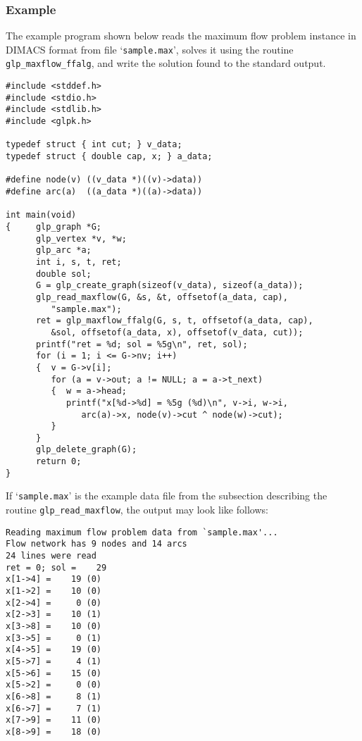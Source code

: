 \documentclass[dvipdfm,11pt]{report}
\begin{document}
\subsubsection*{Example}

The example program shown below reads the maximum flow problem instance
in DIMACS format from file `\verb|sample.max|', solves it using the
routine \verb|glp_maxflow_ffalg|, and write the solution found to the
standard output.

\begin{footnotesize}
\begin{verbatim}
#include <stddef.h>
#include <stdio.h>
#include <stdlib.h>
#include <glpk.h>

typedef struct { int cut; } v_data;
typedef struct { double cap, x; } a_data;

#define node(v) ((v_data *)((v)->data))
#define arc(a)  ((a_data *)((a)->data))

int main(void)
{     glp_graph *G;
      glp_vertex *v, *w;
      glp_arc *a;
      int i, s, t, ret;
      double sol;
      G = glp_create_graph(sizeof(v_data), sizeof(a_data));
      glp_read_maxflow(G, &s, &t, offsetof(a_data, cap),
         "sample.max");
      ret = glp_maxflow_ffalg(G, s, t, offsetof(a_data, cap),
         &sol, offsetof(a_data, x), offsetof(v_data, cut));
      printf("ret = %d; sol = %5g\n", ret, sol);
      for (i = 1; i <= G->nv; i++)
      {  v = G->v[i];
         for (a = v->out; a != NULL; a = a->t_next)
         {  w = a->head;
            printf("x[%d->%d] = %5g (%d)\n", v->i, w->i,
               arc(a)->x, node(v)->cut ^ node(w)->cut);
         }
      }
      glp_delete_graph(G);
      return 0;
}
\end{verbatim}
\end{footnotesize}

If `\verb|sample.max|' is the example data file from the subsection
describing the routine \verb|glp_read_maxflow|, the output may look like
follows:

\begin{footnotesize}
\begin{verbatim}
Reading maximum flow problem data from `sample.max'...
Flow network has 9 nodes and 14 arcs
24 lines were read
ret = 0; sol =    29
x[1->4] =    19 (0)
x[1->2] =    10 (0)
x[2->4] =     0 (0)
x[2->3] =    10 (1)
x[3->8] =    10 (0)
x[3->5] =     0 (1)
x[4->5] =    19 (0)
x[5->7] =     4 (1)
x[5->6] =    15 (0)
x[5->2] =     0 (0)
x[6->8] =     8 (1)
x[6->7] =     7 (1)
x[7->9] =    11 (0)
x[8->9] =    18 (0)
\end{verbatim}
\end{footnotesize}
\end{document}
